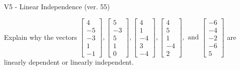 \begin{exercise}
  \begin{exerciseTitle}V5 - Linear Independence (ver. 55)\end{exerciseTitle}
  \begin{exerciseStatement}
    Explain why the vectors \(\left[\begin{array}{r}
4 \\
-5 \\
-3 \\
1 \\
-1
\end{array}\right] , \left[\begin{array}{r}
5 \\
-3 \\
5 \\
1 \\
0
\end{array}\right] , \left[\begin{array}{r}
4 \\
1 \\
-4 \\
3 \\
-4
\end{array}\right] , \left[\begin{array}{r}
4 \\
5 \\
1 \\
-4 \\
2
\end{array}\right] , \text{ and } \left[\begin{array}{r}
-6 \\
-4 \\
-2 \\
-6 \\
5
\end{array}\right]\) are linearly dependent or linearly independent.	



\end{exerciseStatement}
\end{exercise}
